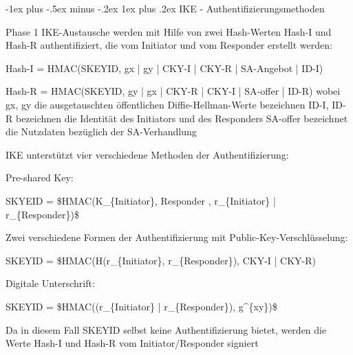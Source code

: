 \documentclass[a4paper]{article}
\makeatletter
\renewcommand{\subsubsection}{\@startsection{subsubsection}{3}{0mm}%
 {-1ex plus -.5ex minus -.2ex}%
 {1ex plus .2ex}%
 {\normalfont\small\bfseries}}
\makeatother
\begin{document}
\begin{multicols}{3}
\begin{itemize*}
            \subsubsection{IKE -
                  Authentifizierungsmethoden}
            \begin{itemize*}
                  \item       Phase 1 IKE-Austausche werden mit Hilfe von zwei Hash-Werten Hash-I
                  und Hash-R authentifiziert, die vom Initiator und vom Responder
                  erstellt werden:
                  \begin{itemize*}
                        \item Hash-I = HMAC(SKEYID, gx | gy | CKY-I | CKY-R | SA-Angebot | ID-I)
                        \item Hash-R = HMAC(SKEYID, gy | gx | CKY-R | CKY-I | SA-offer | ID-R) wobei gx, gy die ausgetauschten öffentlichen Diffie-Hellman-Werte bezeichnen ID-I, ID-R bezeichnen die Identität des Initiators und des Responders SA-offer bezeichnet die Nutzdaten bezüglich der SA-Verhandlung
                  \end{itemize*}
                  \item       IKE unterstützt vier verschiedene Methoden der Authentifizierung:
                  \begin{itemize*}
                        \item Pre-shared Key:
                        \begin{itemize*} \item SKYEID = \$HMAC(K\_\{Initiator\}, Responder , r\_\{Initiator\} | r\_\{Responder\})\$ \end{itemize*}
                        \item Zwei verschiedene Formen der Authentifizierung mit Public-Key-Verschlüsselung:
                        \begin{itemize*} \item SKEYID = \$HMAC(H(r\_\{Initiator\}, r\_\{Responder\}), CKY-I | CKY-R) \end{itemize*}
                        \item Digitale Unterschrift:
                        \begin{itemize*} \item SKEYID = \$HMAC((r\_\{Initiator\} | r\_\{Responder\}), g\^{}\{xy\})\$ \item Da in diesem Fall SKEYID selbst keine Authentifizierung bietet, werden die Werte Hash-I und Hash-R vom Initiator/Responder signiert \end{itemize*}
                  \end{itemize*}
            \end{itemize*}


\end{itemize*}
\end{multicols}
\end{document}

